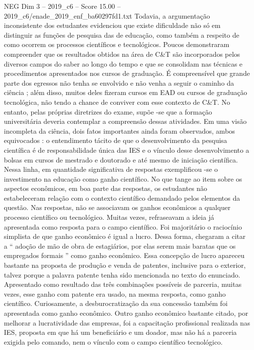 \begin{textsample}{NEG Dim 3 – 2019\_c6 – Score 15.00 – 2019\_c6/enade\_2019\_enf\_ba60297fd1.txt}
Todavia, a argumentação inconsistente dos estudantes evidenciou que existe dificuldade não só em distinguir as funções de pesquisa das de educação, como também a respeito de como ocorrem os processos científicos e tecnológicos.
Poucos demonstraram compreender que os resultados obtidos na área de C\&T são incorporados pelos diversos campos do saber ao longo do tempo e que se consolidam nas técnicas e procedimentos apresentados nos cursos de graduação.
É compreensível que grande parte dos egressos não tenha se envolvido e não venha a seguir o caminho da ciência ; além disso, muitos deles fizeram cursos em EAD ou cursos de graduação tecnológica, não tendo a chance de conviver com esse contexto de C\&T.
No entanto, pelas próprias diretrizes do exame, supõe -se que a formação universitária deveria contemplar a compreensão dessas atividades.
Em uma visão incompleta da ciência, dois fatos importantes ainda foram observados, ambos equivocados : o entendimento tácito de que o desenvolvimento da pesquisa científica é de responsabilidade única das IES e o vínculo desse desenvolvimento a bolsas em cursos de mestrado e doutorado e até mesmo de iniciação científica.
Nessa linha, em quantidade significativa de respostas exemplificou -se o investimento na educação como ganho científico.
No que tange ao item sobre os aspectos econômicos, em boa parte das respostas, os estudantes não estabeleceram relação com o contexto científico demandado pelos elementos da questão.
Nas respostas, não se associavam os ganhos econômicos a qualquer processo científico ou tecnológico.
Muitas vezes, refraseavam a ideia já apresentada como resposta para o campo científico.
Foi majoritário o raciocínio simplista de que ganho econômico é igual a lucro.
Dessa forma, chegaram a citar a “ adoção de mão de obra de estagiários, por elas serem mais baratas que os empregados formais ” como ganho econômico.
Essa concepção de lucro apareceu bastante na proposta de produção e venda de patentes, inclusive para o exterior, talvez porque a palavra patente tenha sido mencionada no texto do enunciado.
Apresentado como resultado das três combinações possíveis de parceria, muitas vezes, esse ganho com patente era usado, na mesma resposta, como ganho científico.
Curiosamente, a desburocratização da sua concessão também foi apresentada como ganho econômico.
Outro ganho econômico bastante citado, por melhorar a lucratividade das empresas, foi a capacitação profissional realizada nas IES, proposta em que há um beneficiário e um doador, mas não há a parceria exigida pelo comando, nem o vínculo com o campo científico tecnológico.

\end{textsample}
